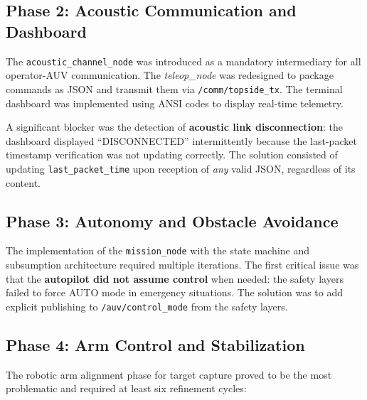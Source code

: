 \documentclass[10pt,twocolumn,letterpaper]{article}
\begin{document}
\subsection{Phase 2: Acoustic Communication and Dashboard}

The \texttt{acoustic\_channel\_node} was introduced as a mandatory intermediary for all operator-AUV communication. The \textit{teleop\_node} was redesigned to package commands as JSON and transmit them via \texttt{/comm/topside\_tx}. The terminal dashboard was implemented using ANSI codes to display real-time telemetry.

A significant blocker was the detection of \textbf{acoustic link disconnection}: the dashboard displayed ``DISCONNECTED'' intermittently because the last-packet timestamp verification was not updating correctly. The solution consisted of updating \texttt{last\_packet\_time} upon reception of \textit{any} valid JSON, regardless of its content.

\subsection{Phase 3: Autonomy and Obstacle Avoidance}

The implementation of the \texttt{mission\_node} with the state machine and subsumption architecture required multiple iterations. The first critical issue was that the \textbf{autopilot did not assume control} when needed: the safety layers failed to force AUTO mode in emergency situations. The solution was to add explicit publishing to \texttt{/auv/control\_mode} from the safety layers.

\subsection{Phase 4: Arm Control and Stabilization}

The robotic arm alignment phase for target capture proved to be the most problematic and required at least six refinement cycles:
\end{document}
